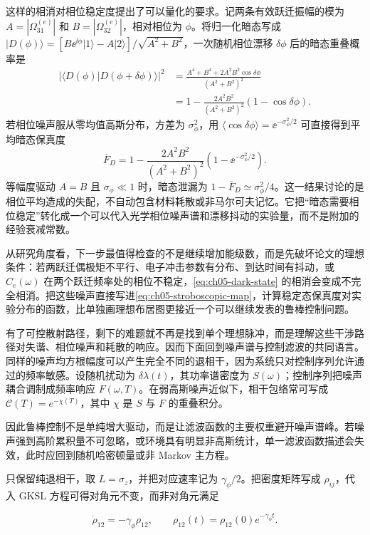这样的相消对相位稳定度提出了可以量化的要求。记两条有效跃迁振幅的模为 $A=|\Omega_{31}^{(e)}|$ 和 $B=|\Omega_{32}^{(e)}|$，相对相位为 $\phi$。将归一化暗态写成 $|D(\phi)\rangle=[B\ee^{\ii\phi}|1\rangle-A|2\rangle]/\sqrt{A^2+B^2}$，一次随机相位漂移 $\delta\phi$ 后的暗态重叠概率是
\begin{align*}
|\langle D(\phi)|D(\phi+\delta\phi)\rangle|^2
&=\frac{A^4+B^4+2A^2B^2\cos\delta\phi}{(A^2+B^2)^2}\\
&=1-\frac{2A^2B^2}{(A^2+B^2)^2}(1-\cos\delta\phi).
\end{align*}
若相位噪声服从零均值高斯分布，方差为 $\sigma_\phi^2$，用 $\langle\cos\delta\phi\rangle=\ee^{-\sigma_\phi^2/2}$ 可直接得到平均暗态保真度
\begin{equation}
\overline{F}_D=1-\frac{2A^2B^2}{(A^2+B^2)^2}
(1-\ee^{-\sigma_\phi^2/2}).
\label{eq:dark-state-phase-jitter}
\end{equation}
等幅度驱动 $A=B$ 且 $\sigma_\phi\ll1$ 时，暗态泄漏为 $1-\overline F_D\simeq\sigma_\phi^2/4$。这一结果讨论的是相位平均造成的失配，不自动包含材料耗散或非马尔可夫记忆。它把“暗态需要相位稳定”转化成一个可以代入光学相位噪声谱和漂移抖动的实验量，而不是附加的经验衰减常数。

从研究角度看，下一步最值得检查的不是继续增加能级数，而是先破坏论文的理想条件：若两跃迁偶极矩不平行、电子冲击参数有分布、到达时间有抖动，或 $C_e(\omega)$ 在两个跃迁频率处的相位不稳定，\cref{eq:ch05-dark-state} 的相消会变成不完全相消。把这些噪声直接写进\cref{eq:ch05-stroboscopic-map}，计算稳定态保真度对实验分布的函数，比单独画理想布居图更接近一个可以继续发表的鲁棒控制问题。

有了可控散射路径，剩下的难题就不再是找到单个理想脉冲，而是理解这些干涉路径对失谐、相位噪声和耗散的响应。因而下面回到噪声谱与控制滤波的共同语言。
同样的噪声均方根幅度可以产生完全不同的退相干，因为系统只对控制序列允许通过的频率敏感。设随机扰动为 $\delta\lambda(t)$，其功率谱密度为 $S(\omega)$；控制序列把噪声耦合调制成频率响应 $F(\omega,T)$。在弱高斯噪声近似下，相干包络常可写成 $\mathcal C(T)=e^{-\chi(T)}$，其中 $\chi$ 是 $S$ 与 $F$ 的重叠积分。

因此鲁棒控制不是单纯增大驱动，而是让滤波函数的主要权重避开噪声谱峰。若噪声强到高阶累积量不可忽略，或环境具有明显非高斯统计，单一滤波函数描述会失效，此时应回到随机哈密顿量或非 Markov 主方程。


只保留纯退相干，取 $L=\sigma_z$，并把对应速率记为 $\gamma_\phi/2$。把密度矩阵写成 $\rho_{ij}$，代入 GKSL 方程可得对角元不变，而非对角元满足


\begin{equation*}
\dot\rho_{12}=-\gamma_\phi\rho_{12},\qquad \rho_{12}(t)=\rho_{12}(0)e^{-\gamma_\phi t}.
\end{equation*}


